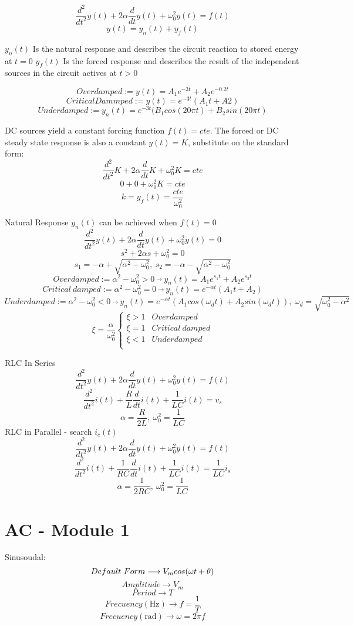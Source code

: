 \documentclass[]{article}
\begin{document}
$$\frac{d^{2}}{d t^2} y(t) +2\alpha\frac{d}{dt} y\left(t\right)+\omega_0^2y(t)=f(t)$$
$$y(t) = y_n(t)+y_f(t)$$

$y_n(t)$ Is the natural response and describes the circuit reaction to stored energy at $t=0$
$y_f(t)$ Is the forced response and describes the result of the independent sources in the circuit actives at $t>0$

$$Overdamped :=  y(t)=A_1e^{-3t}+A_2e^{-0.2t}$$
$$Critical Dammped :=  y(t)=e^{-3t}(A_1t+A2)$$
$$Underdamped:= y_n(t)=e^{-3t}(B_1cos(20\pi t)+B_2sin(20\pi t)$$

DC sources yield a constant forcing function $f(t)=cte$. The forced or DC steady state response is also a constant $y(t)=K$, substitute on the standard form:
$$\frac{d^{2}}{d t^2} K +2\alpha\frac{d}{dt} K+\omega_0^2K=cte$$
$$0+0+\omega_0^2K=cte$$
$$k=y_f(t)=\frac{cte}{\omega_0^2}$$

Natural Response
$y_n(t)$ can be achieved when $f(t)=0$
$$\frac{d^{2}}{d t^2} y(t) +2\alpha\frac{d}{dt} y\left(t\right)+\omega_0^2y(t)=0$$
$$s^2 +2\alpha s+\omega_0^2=0$$
$$s_1=- \alpha + \sqrt{\alpha^2-\omega_0^2}, \ s_2=- \alpha - \sqrt{\alpha^2-\omega_0^2}$$
$$Overdamped:=\alpha^2 -\omega_0^2>0\ \overrightarrow{} \ y_n(t)=A_1e^{s_1t}+A_2e^{s_2t}$$
$$Critical \ damped:=\alpha^2 -\omega_0^2=0\ \overrightarrow{} \ y_n(t)=e^{-\alpha t}(A_1t+A_2)$$
$$Underdamped:=\alpha^2 -\omega_0^2<0\ \overrightarrow{} \ y_n(t)=e^{-\alpha t}(A_1cos(\omega_dt)+A_2sin(\omega_dt)), \ \omega_d=\sqrt{\omega_0^2-\alpha^2}$$
\[ \xi=\frac{\alpha}{\omega_0^2}  \left\{
\begin{array}{ll}
\xi>1 & Overdamped \\
\xi=1 & Critical\ damped \\
\xi<1 & Underdamped \\
\end{array} 
\right. \]

RLC In Series
$$\frac{d^{2}}{d t^2} y(t) +2\alpha\frac{d}{dt} y\left(t\right)+\omega_0^2y(t)=f(t)$$
$$\frac{d^{2}}{d t^2} i(t) +\frac{R}{L}\frac{d}{dt} i\left(t\right)+\frac{1}{LC}i(t)=v_s$$
$$\alpha=\frac{R}{2L},\ \omega_0^2=\frac{1}{LC}$$
RLC in Parallel - search $i_c(t)$
$$\frac{d^{2}}{d t^2} y(t) +2\alpha\frac{d}{dt} y\left(t\right)+\omega_0^2y(t)=f(t)$$
$$\frac{d^{2}}{d t^2} i(t) +\frac{1}{RC}\frac{d}{dt} i\left(t\right)+\frac{1}{LC}i(t)=\frac{1}{LC}i_s$$
$$\alpha=\frac{1}{2RC},\ \omega_0^2=\frac{1}{LC}$$
\newpage
\section{AC - Module 1}
Sinusoudal:
$$
Default\ Form \longrightarrow V_m \\cos(\omega t + \theta) 
$$
$$
Amplitude \longrightarrow V_m 
$$
$$
Period \longrightarrow T 
$$
$$
Frecuency(\si{\hertz}) \longrightarrow f= \frac{1}{T} 
$$
$$
Frecuency(\si{\radian}) \longrightarrow \omega= 2\pi f 
$$
\end{document}
